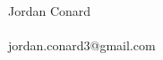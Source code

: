 \documentclass[letterpaper]{article}
\begin{document}
\pagestyle{empty} %


\begin{center}
    {\Huge Jordan Conard}\\~\\
    jordan.conard3@gmail.com\\
\end{center}


\end{document}
